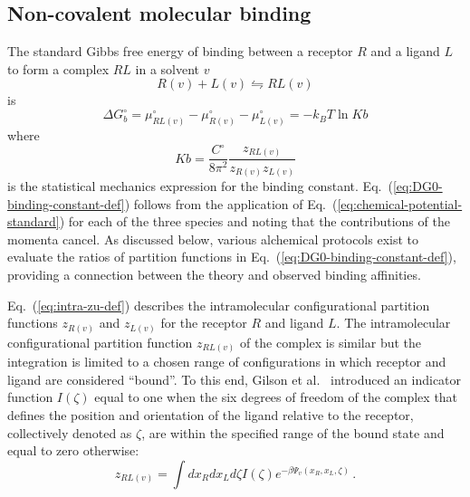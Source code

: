 \documentclass[9pt,bestpractices]{livecoms}
\begin{document}
\subsection{Non-covalent molecular binding}

The standard Gibbs free energy of binding between a receptor $R$ and a ligand $L$ to form a complex $RL$ in a solvent $v$
\begin{equation}
  R(v) + L(v)  \leftrightharpoons RL(v)
  \label{eq:binding-reaction}
\end{equation}
is
\begin{equation}
  \Delta G^\circ_{b} = \mu^\circ_{RL(v)}  - \mu^\circ_{R(v)} - \mu^\circ_{L(v)} = -k_B T \ln Kb 
  \label{eq:DG0-binding-def}
\end{equation}
where~\cite{gilson1997statisticalthermodynamic,gilson2007calculation}
\begin{equation}
  Kb = \frac{C^\circ}{8 \pi^2} \frac{z_{RL(v)}}{z_{R(v)} z_{L(v)}}
  \label{eq:DG0-binding-constant-def}
\end{equation}
is the statistical mechanics expression for the binding constant. Eq.~(\ref{eq:DG0-binding-constant-def}) follows from the application of  Eq.~(\ref{eq:chemical-potential-standard}) for each of the three species and noting that the contributions of the momenta cancel. As discussed below, various alchemical protocols exist to evaluate the ratios of partition functions in Eq.~(\ref{eq:DG0-binding-constant-def}), providing a connection between the theory and observed binding affinities.

Eq.~(\ref{eq:intra-zu-def}) describes the intramolecular configurational partition functions $z_{R(v)}$ and $z_{L(v)}$ for the receptor $R$ and ligand $L$. The intramolecular configurational partition function $z_{RL(v)}$ of the complex is similar but the integration is limited to a chosen range of configurations in which receptor and ligand are considered ``bound''. To this end, Gilson et al.~\cite{gilson1997statisticalthermodynamic} introduced an indicator function $I(\zeta)$ equal to one when the six degrees of freedom of the complex that defines the position and orientation of the ligand relative to the receptor, collectively denoted as $\zeta$, are within the specified range of the bound state and equal to zero otherwise:
\begin{equation}
  z_{RL(v)} = \int dx_R dx_L d\zeta I(\zeta) e^{-\beta \Psi_v(x_R, x_L, \zeta)} \, .
  \label{eq:intra-zRL-def}
\end{equation}
\end{document}
